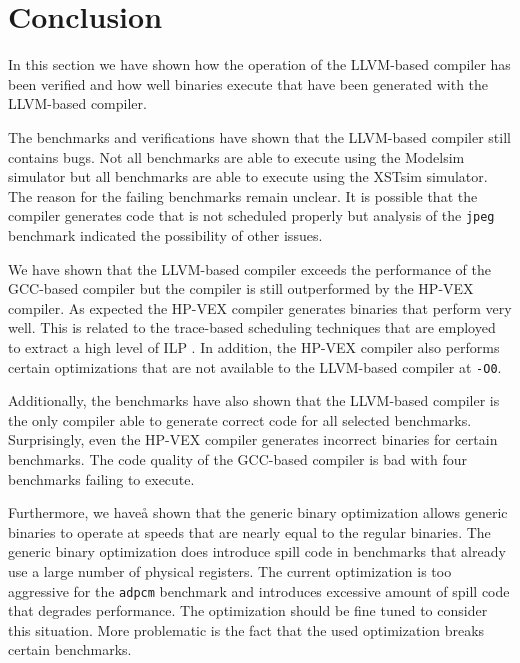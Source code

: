 \section{Conclusion}
In this section we have shown how the operation of the LLVM-based compiler has been verified and how well binaries execute that have been generated with the LLVM-based compiler.

The benchmarks and verifications have shown that the LLVM-based compiler still contains bugs. Not all benchmarks are able to execute using the Modelsim simulator but all benchmarks are able to execute using the XSTsim simulator. The reason for the failing benchmarks remain unclear. It is possible that the compiler generates code that is not scheduled properly but analysis of the \texttt{jpeg} benchmark indicated the possibility of other issues. 

We have shown that the LLVM-based compiler exceeds the performance of the GCC-based compiler but the compiler is still outperformed by the HP-VEX compiler. As expected the HP-VEX compiler generates binaries that perform very well. This is related to the trace-based scheduling techniques that are employed to extract a high level of ILP \cite{Lowney:1993qy}. In addition, the HP-VEX compiler also performs certain optimizations that are not available to the LLVM-based compiler at \texttt{-O0}.

Additionally, the benchmarks have also shown that the LLVM-based compiler is the only compiler able to generate correct code for all selected benchmarks. Surprisingly, even the HP-VEX compiler generates incorrect binaries for certain benchmarks. The code quality of the GCC-based compiler is bad with four benchmarks failing to execute.

Furthermore, we haveå shown that the generic binary optimization allows generic binaries to operate at speeds that are nearly equal to the regular binaries. The generic binary optimization does introduce spill code in benchmarks that already use a large number of physical registers. The current optimization is too aggressive for the \texttt{adpcm} benchmark and introduces excessive amount of spill code that degrades performance. The optimization should be fine tuned to consider this situation. More problematic is the fact that the used optimization breaks certain benchmarks.

\acresetall

